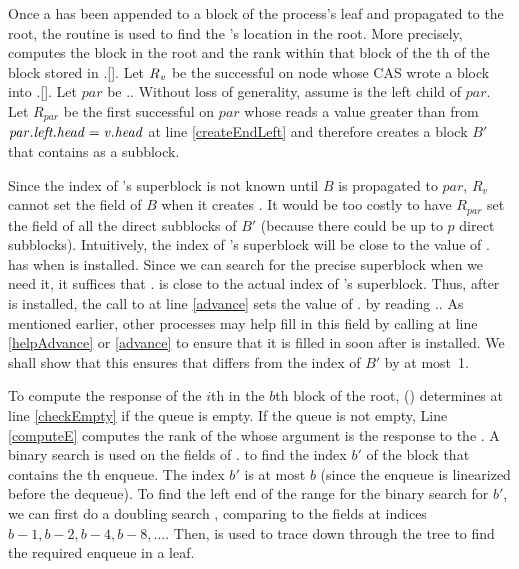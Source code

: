 Once a  has been appended to a block of the process's leaf and propagated to the root,
the  routine is used to find the 's location in the root.
More precisely, 
computes the block in the root and the rank
within that block  of the th  of the block  stored in .[].
Let $R\textsubscript{\mbox{\textit{v}}}$ be the successful  on node 
whose CAS wrote a block  into .[].
Let $par$ be .. Without loss of generality, assume 
 is the left child of $par$. Let
$R_{par}$ be the first successful  on $par$ whose  reads a
value greater than  from $\mbox{\textit{par}}.\mbox{\textit{left.head}}=\mbox{\textit{v}}.\mbox{\textit{head}}$ at line \ref{createEndLeft} and therefore creates a block $B'$ that contains
 as a subblock. 
 
Since the index of 's superblock is not known until $B$ is
propagated to $par$, $R_v$ cannot set the  field of ${B}$ when
it creates . 
It would be too costly to have $R_{par}$ set the  field of all the direct subblocks of $B'$ (because
there could be up to $p$ direct subblocks).
Intuitively, the index of 's superblock will be close to the value of . has when  is installed.
Since we can search for the precise superblock when we need it, it suffices that .
is close to the actual index of 's superblock.
Thus, after  is installed, the call to  at line \ref{advance} sets the value of . by reading ..
As mentioned earlier, other processes may help fill in this field by calling  at line \ref{helpAdvance} or \ref{advance} to ensure that it is filled in soon after  is installed.
We shall
show that this ensures that  differs
from the index of $B'$ by at most~1. 

To compute the response of the $i$th  in the $b$th block
of the root, () determines at line \ref{checkEmpty} if the queue is empty.
If the queue is
not empty, Line \ref{computeE} computes the rank  of the
 whose argument is the response to the
. 
A binary search is used on the  fields of . to find the index $b'$ of the block that contains 
the th enqueue.
The index $b'$ is at most $b$ (since the enqueue is linearized before the dequeue).  To find the left end of the range for the binary search for $b'$, we can first do a doubling search \cite{BY76}, comparing  to the  fields at indices $b-1, b-2, b-4, b-8, \ldots$.
Then,  is used to trace down through the tree to find the required enqueue in a leaf.

